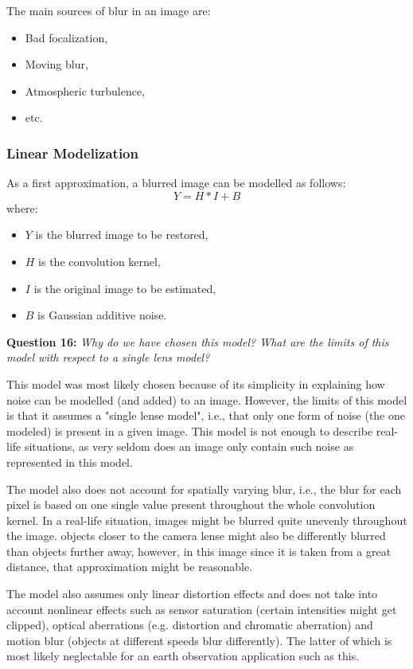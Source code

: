The main sources of blur in an image are:
\begin{itemize}
    \item Bad focalization,
    \item Moving blur,
    \item Atmospheric turbulence,
    \item etc.
\end{itemize}

\subsubsection{Linear Modelization}

As a first approximation, a blurred image can be modelled as follows:
\begin{equation}
    Y = H  *  I + B
\end{equation}
where:
\begin{itemize}
    \item $Y$ is the blurred image to be restored,
    \item $H$ is the convolution kernel,
    \item $I$ is the original image to be estimated,
    \item $B$ is Gaussian additive noise.
\end{itemize}

\textbf{Question 16:}
\textit{Why do we have chosen this model? What are the limits of this model with respect to a single lens model?}

This model was most likely chosen because of its simplicity in explaining how noise can be modelled (and added) to an image. However, the limits of this model is that it assumes a "single lense model", i.e., that only one form of noise (the one modeled) is present in a given image. This model is not enough to describe real-life situations, as very seldom does an image only contain such noise as represented in this model. 

The model also does not account for spatially varying blur, i.e., the blur for each pixel is based on one single value present throughout the whole convolution kernel. In a real-life situation, images might be blurred quite unevenly throughout the image. objects closer to the camera lense might also be differently blurred than objects further away, however, in this image since it is taken from a great distance, that approximation might be reasonable.

The model also assumes only linear distortion effects and does not take into account nonlinear effects such as sensor saturation (certain intensities might get clipped), optical aberrations (e.g. distortion and chromatic aberration) and motion blur (objects at different speeds blur differently). The latter of which is most likely neglectable for an earth observation application such as this.

